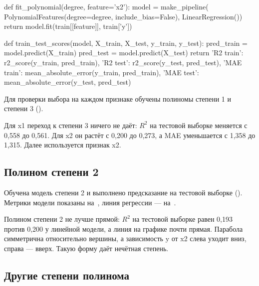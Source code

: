 \documentclass[a4paper,14pt]{extarticle}
\begin{document}
    def fit_polynomial(degree, feature='x2'):
        model = make_pipeline(
            PolynomialFeatures(degree=degree, include_bias=False),
            LinearRegression())
        return model.fit(train[[feature]], train['y'])


    def train_test_scores(model, X_train, X_test, y_train, y_test):
        pred_train = model.predict(X_train)
        pred_test = model.predict(X_test)
        return {'R2 train': r2_score(y_train, pred_train),
                'R2 test': r2_score(y_test, pred_test),
                'MAE train': mean_absolute_error(y_train, pred_train),
                'MAE test': mean_absolute_error(y_test, pred_test)}

Для проверки выбора на каждом признаке обучены полиномы степени 1 и степени 3 ().


Для x1 переход к степени 3 ничего не даёт: $R^2$ на тестовой выборке меняется с 0,558 до 0,561. Для x2 он растёт с 0,200 до 0,273, а MAE уменьшается с 1,358 до 1,315. Далее используется признак x2.

\subsection{Полином степени 2}

Обучена модель степени 2 и выполнено предсказание на тестовой выборке (). Метрики модели показаны на~, линия регрессии — на~.




Полином степени 2 не лучше прямой: $R^2$ на тестовой выборке равен 0,193 против 0,200 у линейной модели, а линия на графике почти прямая. Парабола симметрична относительно вершины, а зависимость y от x2 слева уходит вниз, справа — вверх. Такую форму даёт нечётная степень.

\subsection{Другие степени полинома}
\end{document}
